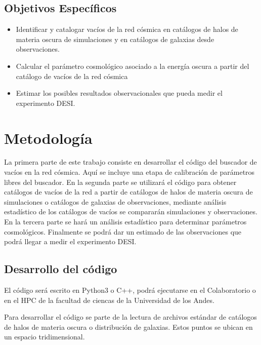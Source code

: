 \documentclass[preprint]{aastex62}
\begin{document}
  \subsection{Objetivos Específicos}

  \begin{itemize}

      \item Identificar y catalogar vacíos de la red cósmica en catálogos de halos de materia oscura de
  simulaciones y en catálogos de galaxias desde observaciones.

      \item Calcular el parámetro cosmológico asociado a la energía oscura a partir del catálogo de
  vacíos de la red cósmica

    \item  Estimar los posibles resultados observacionales que pueda medir el experimento DESI.
  \end{itemize}
  
  \section{Metodología}

  La primera parte de este trabajo consiste en desarrollar el código del buscador de vacíos
  en la red cósmica. Aquí se incluye una etapa de calibración de parámetros libres del buscador.
  En la segunda parte se utilizará el código para obtener catálogos
  de vacíos de la red a partir de catálogos de halos de materia oscura de simulaciones o
  catálogos de galaxias de observaciones, mediante análisis estadístico de los catálogos de
  vacíos se compararán simulaciones y observaciones.
  En la tercera parte se hará un análisis estadístico para determinar parámetros cosmológicos.
  Finalmente se podrá dar un estimado de las observaciones que podrá llegar a medir el
  experimento DESI.

  \subsection{Desarrollo del código}

  El código será escrito en Python3 o C++, podrá ejecutarse en el Colaboratorio o en el HPC de la
  facultad de ciencas de la Universidad de los Andes.
  
  Para desarrollar el código se parte de la lectura de archivos estándar de catálogos de halos
  de materia oscura o distribución de galaxias. Estos puntos se ubican en un espacio tridimensional.
\end{document}
